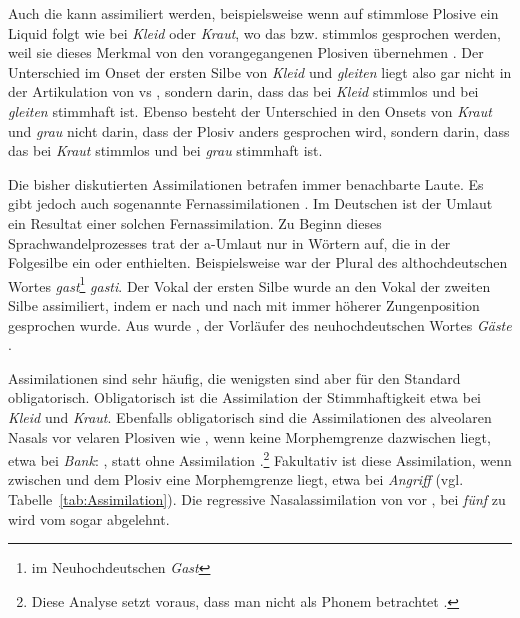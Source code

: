 \normalsize

Auch die  kann assimiliert werden, beispielsweise wenn auf stimmlose Plosive ein Liquid folgt wie bei \textit{Kleid} oder \textit{Kraut}, wo das  bzw.  stimmlos gesprochen werden, weil sie dieses Merkmal von den vorangegangenen Plosiven übernehmen \citep[70]{FuhrhopPeters2013}. Der Unterschied im Onset der ersten Silbe von \textit{Kleid} und \textit{gleiten} liegt also gar nicht in der Artikulation von  vs , sondern darin, dass das  bei \textit{Kleid} stimmlos und bei \textit{gleiten} stimmhaft ist. Ebenso besteht der Unterschied in den Onsets von \textit{Kraut} und \textit{grau} nicht darin, dass der Plosiv anders gesprochen wird, sondern darin, dass das  bei \textit{Kraut} stimmlos und bei \textit{grau} stimmhaft ist.

Die bisher diskutierten Assimilationen betrafen immer benachbarte Laute. Es gibt jedoch auch sogenannte Fernassimilationen \citep[71]{FuhrhopPeters2013}. Im Deutschen ist der Umlaut ein Resultat einer solchen Fernassimilation. Zu Beginn dieses Sprachwandelprozesses trat der a-Umlaut \textipa{[E]}  nur in Wörtern auf, die in der Folgesilbe ein  oder  enthielten. Beispielsweise war der Plural des althochdeutschen Wortes \textit{gast}\footnote{im Neuhochdeutschen \textit{Gast}} \textit{gasti}. Der Vokal der ersten Silbe  wurde an den Vokal der zweiten Silbe assimiliert, indem er nach und nach mit immer höherer Zungenposition gesprochen wurde. Aus \textipa{[gasti]} wurde \textipa{[gEsti]}, der Vorläufer des neuhochdeutschen Wortes \textit{Gäste} \citep[40]{Nuebling_et_al_2017}.

Assimilationen sind sehr häufig, die wenigsten sind aber für den Standard obligatorisch. Obligatorisch ist die Assimilation der Stimmhaftigkeit etwa bei \textit{Kleid} und \textit{Kraut}. Ebenfalls obligatorisch sind die Assimilationen des alveolaren Nasals  vor velaren Plosiven wie , wenn keine Morphemgrenze dazwischen liegt, etwa  bei \textit{Bank}: \textipa{[baNk]}, statt ohne Assimilation \textipa{[bank]}.\footnote{Diese Analyse setzt voraus, dass man \textipa{[N]} nicht als Phonem betrachtet \citep[66f]{Hall2000}.} Fakultativ ist diese Assimilation, wenn zwischen  und dem Plosiv eine Morphemgrenze liegt, etwa bei \textit{Angriff} (vgl. Tabelle~\ref{tab:Assimilation}). Die regressive Nasalassimilation von  vor , \zB bei \textit{fünf} \textipa{[fYnf]} zu \textipa{[fYmf]} wird vom \citet[139]{DudenZweifelsfaelle2021} sogar abgelehnt.

